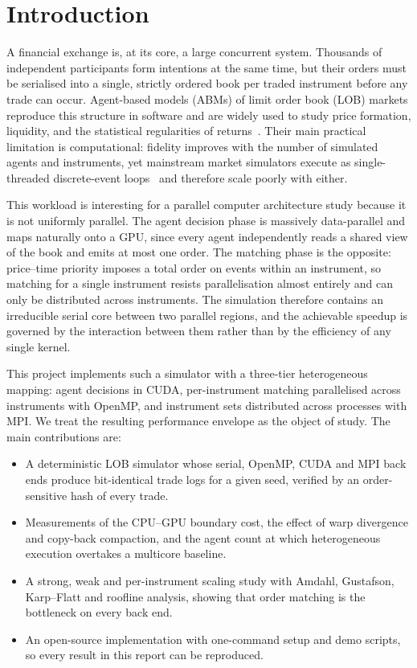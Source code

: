 
\section{Introduction}
A financial exchange is, at its core, a large concurrent system. Thousands of independent
participants form intentions at the same time, but their orders must be serialised into a single,
strictly ordered book per traded instrument before any trade can occur. Agent-based models (ABMs)
of limit order book (LOB) markets reproduce this structure in software and are widely used to study
price formation, liquidity, and the statistical regularities of returns~\cite{cont2001,preis2006}.
Their main practical limitation is computational: fidelity improves with the number of simulated
agents and instruments, yet mainstream market simulators execute as single-threaded discrete-event
loops~\cite{byrd2020abides} and therefore scale poorly with either.

This workload is interesting for a parallel computer architecture study because it is not
uniformly parallel. The agent decision phase is massively data-parallel and maps naturally onto a
GPU, since every agent independently reads a shared view of the book and emits at most one order.
The matching phase is the opposite: price--time priority imposes a total order on events within an
instrument, so matching for a single instrument resists parallelisation almost entirely and can
only be distributed across instruments. The simulation therefore contains an irreducible serial
core between two parallel regions, and the achievable speedup is governed by the interaction
between them rather than by the efficiency of any single kernel.

This project implements such a simulator with a three-tier heterogeneous mapping: agent decisions
in CUDA, per-instrument matching parallelised across instruments with OpenMP, and instrument sets
distributed across processes with MPI. We treat the resulting performance envelope as the object
of study. The main contributions are:
\begin{itemize}
\item A deterministic LOB simulator whose serial, OpenMP, CUDA and MPI back ends produce
  bit-identical trade logs for a given seed, verified by an order-sensitive hash of every trade.
\item Measurements of the CPU--GPU boundary cost, the effect of warp divergence and copy-back
  compaction, and the agent count at which heterogeneous execution overtakes a multicore baseline.
\item A strong, weak and per-instrument scaling study with Amdahl, Gustafson, Karp--Flatt and
  roofline analysis, showing that order matching is the bottleneck on every back end.
\item An open-source implementation with one-command setup and demo scripts, so every result in
  this report can be reproduced.
\end{itemize}

